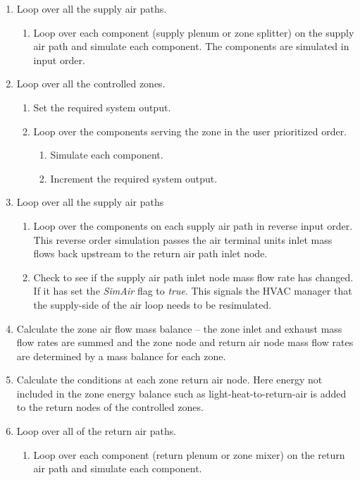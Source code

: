 \begin{enumerate}
\def\labelenumi{\arabic{enumi}.}
\def\labelenumii{\alph{enumii}.}
\def\labelenumiii{\roman{enumiii}.}
  \item
    Loop over all the supply air paths.
    \begin{enumerate}
      \item
        Loop over each component (supply plenum or zone splitter) on the supply air path and simulate each component. The components are simulated in input order.
    \end{enumerate}
  \item
    Loop over all the controlled zones.
    \begin{enumerate}
      \item
        Set the required system output.
      \item
        Loop over the components serving the zone in the user prioritized order.
        \begin{enumerate}
          \item
            Simulate each component.
          \item
            Increment the required system output.
        \end{enumerate}
    \end{enumerate}
  \item
    Loop over all the supply air paths
    \begin{enumerate}
      \item
        Loop over the components on each supply air path in reverse input order. This reverse order simulation passes the air terminal units inlet mass flows back upstream to the return air path inlet node.
      \item
        Check to see if the supply air path inlet node mass flow rate has changed. If it has set the \emph{SimAir} flag to \emph{true}. This signals the HVAC manager that the supply-side of the air loop needs to be resimulated.
    \end{enumerate}
  \item
    Calculate the zone air flow mass balance -- the zone inlet and exhaust mass flow rates are summed and the zone node and return air node mass flow rates are determined by a mass balance for each zone.
  \item
    Calculate the conditions at each zone return air node. Here energy not included in the zone energy balance such as light-heat-to-return-air is added to the return nodes of the controlled zones.
  \item
    Loop over all of the return air paths.
    \begin{enumerate}
      \item
        Loop over each component (return plenum or zone mixer) on the return air path and simulate each component.
    \end{enumerate}
\end{enumerate}

